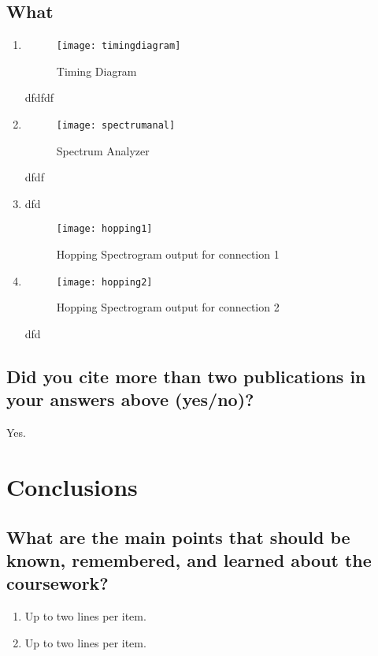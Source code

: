 \subsection{What}

\begin{enumerate}		
	\item
		\begin{figure}[ht]
			\centering
			\captionsetup{justification=centering,margin=2cm}
			\texttt{[image: timingdiagram]}
			\caption{Timing Diagram}
		\end{figure}
	dfdfdf
	\item
	\begin{figure}[ht]
	\centering
	\captionsetup{justification=centering,margin=2cm}
	\texttt{[image: spectrumanal]}
	\caption{Spectrum Analyzer}
	\end{figure}
dfdf
	\item 
dfd
	\begin{figure}[ht]
	\centering
	\captionsetup{justification=centering,margin=2cm}
	\texttt{[image: hopping1]}
	\caption{Hopping Spectrogram output for connection 1}
	\end{figure}

	\item 
	\begin{figure}[ht]
	\centering
	\captionsetup{justification=centering,margin=2cm}
	\texttt{[image: hopping2]}
	\caption{Hopping Spectrogram output for connection 2}
	\end{figure}
dfd
\end{enumerate}

\subsection{Did you cite more than two publications in your answers above (yes/no)?}
Yes.	



\section{Conclusions}
\label{sec:conc}

\subsection{What are the main points that should be known, remembered, and learned about the coursework?}
\begin{enumerate}
	\item Up to two lines per item.
	\item Up to two lines per item.
\end{enumerate}

